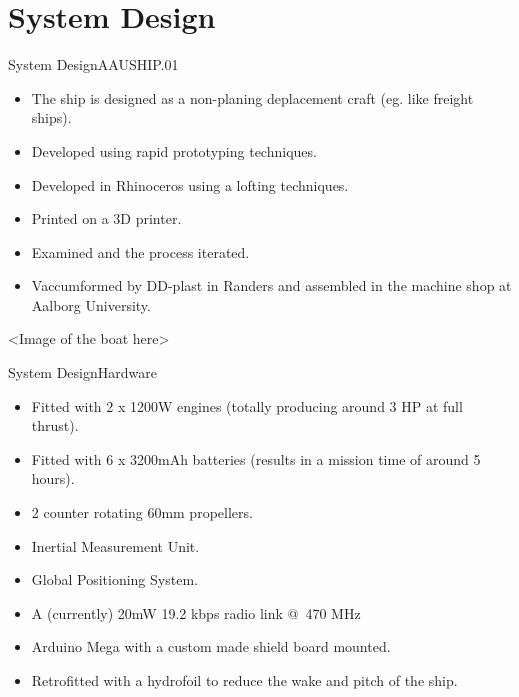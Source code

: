 \documentclass[10pt,handout]{beamer}
\begin{document}
\section{System Design}
\begin{frame}{System Design}{AAUSHIP.01}
\begin{itemize}
  \item<1-> The ship is designed as a non-planing deplacement craft (eg. like freight ships).
  \item<2-> Developed using rapid prototyping techniques.
  \item<3-> Developed in Rhinoceros using a lofting techniques.
  \item<4-> Printed on a 3D printer.
  \item<5-> Examined and the process iterated.
  \item<6-> Vaccumformed by DD-plast in Randers and assembled in the machine shop at Aalborg University.
\end{itemize}
<Image of the boat here>
\end{frame}

\begin{frame}{System Design}{Hardware}
\begin{itemize}
  \item Fitted with 2 x 1200W engines (totally producing around 3 HP at full thrust).
  \item Fitted with 6 x 3200mAh batteries (results in a mission time of around 5 hours).
  \item 2 counter rotating 60mm propellers.
  \item Inertial Measurement Unit.
  \item Global Positioning System.
  \item A (currently) 20mW 19.2 kbps radio link @ 470 MHz
  \item Arduino Mega with a custom made shield board mounted.
  \item Retrofitted with a hydrofoil to reduce the wake and pitch of the ship.
\end{itemize}
\end{frame}
\end{document}
